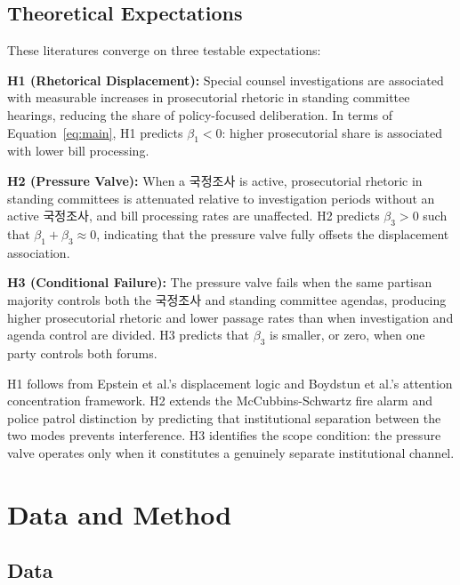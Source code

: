 \documentclass[11pt]{article}
\begin{document}
\subsection{Theoretical Expectations}

These literatures converge on three testable expectations:

\medskip
\noindent \textbf{H1 (Rhetorical Displacement):} Special counsel investigations are associated with measurable increases in prosecutorial rhetoric in standing committee hearings, reducing the share of policy-focused deliberation. In terms of Equation~\ref{eq:main}, H1 predicts $\beta_1 < 0$: higher prosecutorial share is associated with lower bill processing.

\medskip
\noindent \textbf{H2 (Pressure Valve):} When a 국정조사 is active, prosecutorial rhetoric in standing committees is attenuated relative to investigation periods without an active 국정조사, and bill processing rates are unaffected. H2 predicts $\beta_3 > 0$ such that $\beta_1 + \beta_3 \approx 0$, indicating that the pressure valve fully offsets the displacement association.

\medskip
\noindent \textbf{H3 (Conditional Failure):} The pressure valve fails when the same partisan majority controls both the 국정조사 and standing committee agendas, producing higher prosecutorial rhetoric and lower passage rates than when investigation and agenda control are divided. H3 predicts that $\beta_3$ is smaller, or zero, when one party controls both forums.

\medskip
H1 follows from Epstein et al.'s displacement logic and Boydstun et al.'s attention concentration framework. H2 extends the McCubbins-Schwartz fire alarm and police patrol distinction by predicting that institutional separation between the two modes prevents interference. H3 identifies the scope condition: the pressure valve operates only when it constitutes a genuinely separate institutional channel.


\section{Data and Method}
\label{sec:data}

\subsection{Data}
\end{document}
